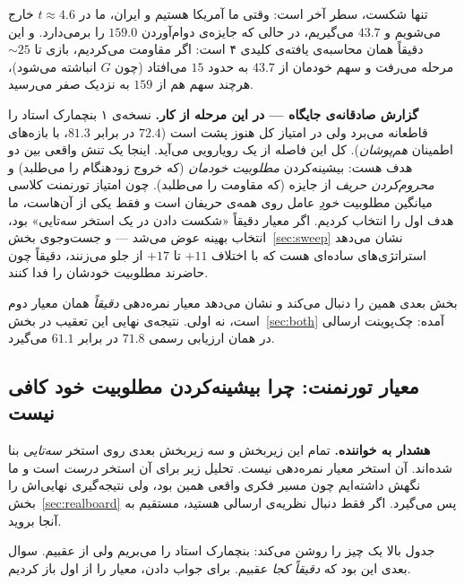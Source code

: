 \documentclass[12pt,a4paper]{article}
\begin{document}
تنها شکست، سطر آخر است: وقتی ما آمریکا هستیم و  ایران، ما در
$t\approx4.6$ خارج می‌شویم و $43.7$ می‌گیریم، در حالی که 
جایزه‌ی دوام‌آوردن $159.0$ را برمی‌دارد. و این دقیقاً همان محاسبه‌ی
یافته‌ی کلیدی ۴ است: اگر مقاومت می‌کردیم، بازی تا $\sim25$ مرحله می‌رفت و
سهم خودمان از $43.7$ به حدود $15$ می‌افتاد (چون $G$ انباشته
می‌شود)، هرچند سهم  هم از $159$ به نزدیک صفر می‌رسید.

\begin{answer}
\textbf{گزارش صادقانه‌ی جایگاه — در این مرحله از کار.} نسخه‌ی ۱ بنچمارک
استاد را قاطعانه می‌برد ولی در امتیاز کل هنوز پشت  است
(‏$72.4$ در برابر $81.3$، با بازه‌های اطمینان \emph{هم‌پوشان}). کل این
فاصله از یک رویارویی می‌آید. اینجا یک تنش واقعی بین دو هدف هست: بیشینه‌کردن
\emph{مطلوبیت خودمان} (که خروج زودهنگام را می‌طلبد) و
\emph{محروم‌کردن حریف} از جایزه (که مقاومت را می‌طلبد). چون امتیاز تورنمنت
کلاسی میانگین مطلوبیت \emph{خودِ} عامل روی همه‌ی حریفان است و
 فقط یکی از آن‌هاست، ما هدف اول را انتخاب کردیم. اگر معیار
دقیقاً «شکست دادن  در یک استخر سه‌تایی» بود، انتخاب بهینه
عوض می‌شد — و جست‌وجوی بخش~\ref{sec:sweep} نشان می‌دهد استراتژی‌های ساده‌ای
هست که با اختلاف $+11$ تا $+17$ از  جلو می‌زنند، دقیقاً چون
حاضرند مطلوبیت خودشان را فدا کنند.

بخش بعدی همین را دنبال می‌کند و نشان می‌دهد معیار نمره‌دهی \emph{دقیقاً}
همان معیار دوم است، نه اولی. نتیجه‌ی نهایی این تعقیب در
بخش~\ref{sec:both} آمده: چک‌پوینت ارسالی در همان ارزیابی رسمی $71.8$ در
برابر $61.1$ می‌گیرد.
\end{answer}

\subsection{معیار تورنمنت: چرا بیشینه‌کردن مطلوبیت خود کافی نیست}
\label{sec:tourn}

\begin{answer}
\textbf{هشدار به خواننده.} تمام این زیربخش و سه زیربخش بعدی روی استخر
\emph{سه‌تایی}  بنا شده‌اند. آن استخر معیار
نمره‌دهی نیست. تحلیل زیر برای آن استخر \emph{درست} است و ما نگهش داشته‌ایم
چون مسیر فکری واقعی همین بود، ولی نتیجه‌گیری نهایی‌اش را
بخش~\ref{sec:realboard} پس می‌گیرد. اگر فقط دنبال نظریه‌ی ارسالی هستید،
مستقیم به آنجا بروید.
\end{answer}

جدول بالا یک چیز را روشن می‌کند: بنچمارک استاد را می‌بریم ولی از
 عقبیم. سوال بعدی این بود که \emph{دقیقاً کجا} عقبیم. برای
جواب دادن، معیار را از اول باز کردیم.
\end{document}
